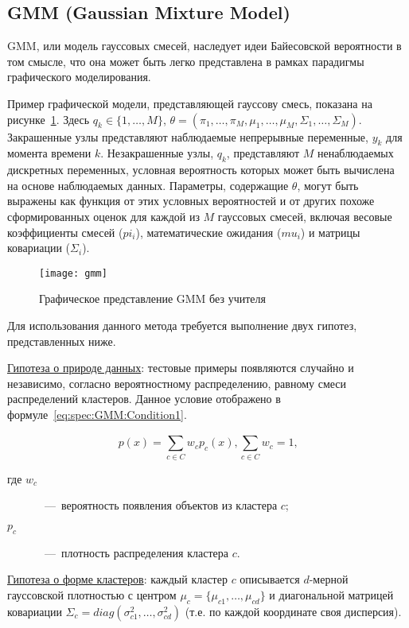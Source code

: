 \subsection{GMM (Gaussian Mixture Model)}
GMM, или модель гауссовых смесей, наследует идеи Байесовской вероятности в том смысле, что она может быть легко представлена в рамках парадигмы графического моделирования.

Пример графической модели, представляющей гауссову смесь, показана на рисунке~\ref{fig:spec:GmmRepresentation}. Здесь $q_k\in \{1,\dots,M\}$, $\theta = (\pi_1,\dots,\pi_M,\mu_1,\dots,\mu_M,\Sigma_1,\dots,\Sigma_M)$. Закрашенные узлы представляют наблюдаемые непрерывные переменные, $y_k$ для момента времени $k$. Незакрашенные узлы, $q_k$, представляют $M$ ненаблюдаемых дискретных переменных, условная вероятность которых может быть вычислена на основе наблюдаемых данных. Параметры, содержащие $\theta$, могут быть выражены как функция от этих условных вероятностей и от других похоже сформированных оценок для каждой из $M$ гауссовых смесей, включая весовые коэффициенты смесей ($pi_i$), математические ожидания ($mu_i$) и матрицы ковариации ($\Sigma_i$).

\begin{figure}[h]
\texttt{[image: gmm]}
\caption{Графическое представление GMM без учителя}
\label{fig:spec:GmmRepresentation}
\end{figure}

Для использования данного метода требуется выполнение двух гипотез, представленных ниже.

\uline{Гипотеза о природе данных}: тестовые примеры появляются случайно и независимо, согласно вероятностному распределению, равному смеси распределений кластеров. Данное условие отображено в формуле~\eqref{eq:spec:GMM:Condition1}.

\begin{equation} \label{eq:spec:GMM:Condition1}
p(x) = \sum_{c\in C}^{} w_c p_c(x), \sum_{c\in C}^{} w_c = 1\text{,}
\end{equation}
\begin{description}
	\item[где $w_c$]~---~вероятность появления объектов из кластера $c$;
	\item[$p_c$]~---~плотность распределения кластера $c$.
\end{description}

\uline{Гипотеза о форме кластеров}: каждый кластер $c$ описывается $d$-мерной гауссовской плотностью с центром $\mu_c = \{\mu_{c1},\dots,\mu_{cd}\}$ и диагональной матрицей ковариации $\Sigma_c = diag(\sigma^2_{c1},\dots,\sigma^2_{cd})$ (т.е. по каждой координате своя дисперсия).

